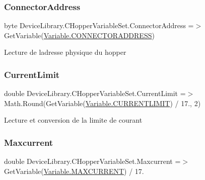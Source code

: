 \subsubsection{\texorpdfstring{Connector\+Address}{ConnectorAddress}}
{\footnotesize\ttfamily byte Device\+Library.\+C\+Hopper\+Variable\+Set.\+Connector\+Address =$>$ Get\+Variable(\mbox{\hyperlink{class_device_library_1_1_c_hopper_variable_set_a3b79d051f89692abb5d34ae3f4e946beaf12ce2bca6832b6bcb08478fb3d50026}{Variable.\+C\+O\+N\+N\+E\+C\+T\+O\+R\+A\+D\+D\+R\+E\+SS}})}



Lecture de l\textquotesingle{}adresse physique du hopper 

\mbox{\label{class_device_library_1_1_c_hopper_variable_set_a878c99ad40cf59721df6cbb6eca89c4a}} 
\subsubsection{\texorpdfstring{Current\+Limit}{CurrentLimit}}
{\footnotesize\ttfamily double Device\+Library.\+C\+Hopper\+Variable\+Set.\+Current\+Limit =$>$ Math.\+Round(Get\+Variable(\mbox{\hyperlink{class_device_library_1_1_c_hopper_variable_set_a3b79d051f89692abb5d34ae3f4e946bea4813867da2e7cbfd225e950893f2063b}{Variable.\+C\+U\+R\+R\+E\+N\+T\+L\+I\+M\+IT}}) / 17., 2)}



Lecture et conversion de la limite de courant 

\mbox{\label{class_device_library_1_1_c_hopper_variable_set_a028cfdeb39a1890d2d91f55717c28811}} 
\subsubsection{\texorpdfstring{Maxcurrent}{Maxcurrent}}
{\footnotesize\ttfamily double Device\+Library.\+C\+Hopper\+Variable\+Set.\+Maxcurrent =$>$ Get\+Variable(\mbox{\hyperlink{class_device_library_1_1_c_hopper_variable_set_a3b79d051f89692abb5d34ae3f4e946bea07eaaced542a660738d0b539a58d1b51}{Variable.\+M\+A\+X\+C\+U\+R\+R\+E\+NT}}) / 17.}



